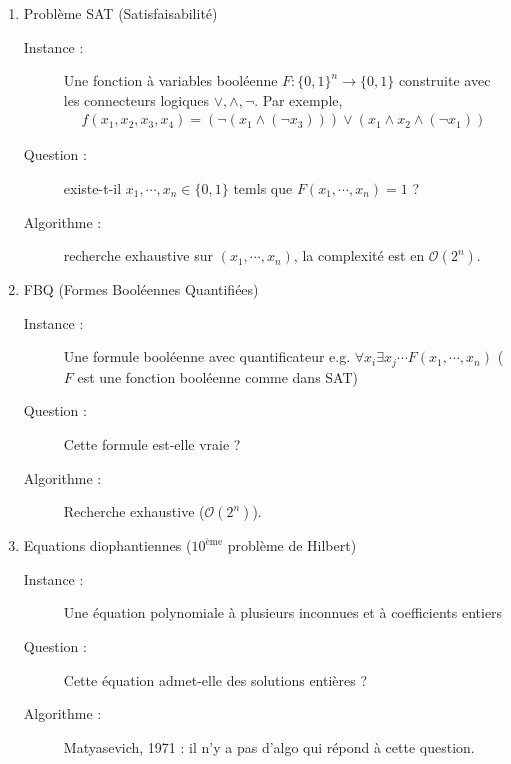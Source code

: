             \begin{expl}
                \begin{enumerate}
                    \item Problème SAT (Satisfaisabilité) 
                    \begin{description}
                        \item[Instance :] Une fonction à variables booléenne $F : \{0,1\}^n \to \{0, 1\}$ construite avec les connecteurs logiques $\lor, \land, \lnot$. Par exemple,
                        \begin{align*}
                            f(x_1, x_2, x_3, x_4) = (\lnot (x_1 \land (\lnot x_3))) \lor (x_1 \land x_2 \land (\lnot x_1))
                        \end{align*}
                        \item[Question :] existe-t-il $x_1, \cdots, x_n \in \{0, 1\}$ temls que $F(x_1, \cdots, x_n) = 1$ ?
                        \item[Algorithme :] recherche exhaustive sur $(x_1, \cdots, x_n)$, la complexité est en $\mathcal{O}(2^n)$.
                    \end{description}
                    \item FBQ (Formes Booléennes Quantifiées)
                    \begin{description}
                        \item[Instance :] Une formule booléenne avec quantificateur e.g. $\forall x_i \exists x_j \cdots F(x_1, \cdots, x_n)$ ($F$ est une fonction booléenne comme dans SAT)
                        \item[Question :] Cette formule est-elle vraie ? 
                        \item[Algorithme :] Recherche exhaustive ($\mathcal{O}(2^n)$).  
                    \end{description}
                    \item Equations diophantiennes ($10^\text{ème}$ problème de Hilbert)
                    \begin{description}
                        \item[Instance :] Une équation polynomiale à plusieurs inconnues et à coefficients entiers
                        \item[Question :] Cette équation admet-elle des solutions entières ?
                        \item[Algorithme :] Matyasevich, 1971 : il n'y a pas d'algo qui répond à cette question.  
                    \end{description}
                \end{enumerate}
            \end{expl}

